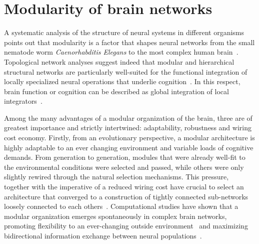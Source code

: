 \section{Modularity of brain networks}
A systematic analysis of the structure of neural systems in different organisms points out that modularity is a factor that shapes neural networks from the small nematode worm \emph{Caenorhabditis Elegans} to the most complex human brain~\cite{towlson2013,park2013}. 
Topological network analyses suggest indeed that modular and hierarchical structural networks are particularly well-suited for the functional integration of locally specialized neural operations that underlie cognition~\cite{sporns2004,sporns2004a,bullmore2012,meunier2010,bressler2010}.
In this respect, brain function or cognition can be described as global integration of local integrators~\cite{park2013}.

Among the many advantages of a modular organization of the brain, three are of greatest importance and strictly intertwined: adaptability, robustness and wiring cost economy.
Firstly, from an evolutionary perspective, a modular architecture is highly adaptable to an ever changing environment and variable loads of cognitive demands.
From generation to generation, modules that were already well-fit to the environmental conditions were selected and passed, while others were only slightly rewired through the natural selection mechanisms. This pressure, together with the imperative of a reduced wiring cost have crucial to select an architecture that converged to a construction of tightly connected sub-networks loosely connected to each others~\cite{clune2013}.
Computational studies have shown that a modular organization emerges spontaneously in complex brain networks, promoting flexibility to an ever-changing outside environment~\cite{kashtan2005,kashtan2007} and maximizing bidirectional information exchange between neural populations~\cite{yamaguti2015}.

